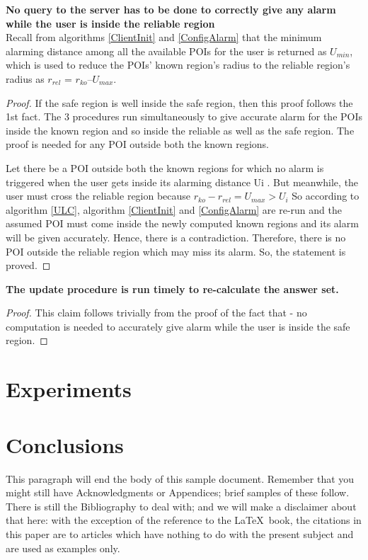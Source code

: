 \documentclass{sig-alternate}
\begin{document}
\textbf{No query to the server has to be done to correctly give any alarm while the user is inside the reliable region}\\
Recall from algorithms \ref{ClientInit} and \ref{ConfigAlarm} that the minimum alarming distance among all the available POIs for the user is returned as $U_{min}$, which is used to reduce the POIs' known region's radius to the reliable region's radius as $r_{rel}$ = $r_{ko} – U_{max}$.

\begin{proof}
If the safe region is well inside the safe region, then this proof follows the 1st fact.
The 3 procedures run simultaneously to give accurate alarm for the POIs inside the known region and so inside the reliable as well as the safe region.
The proof is needed for any POI outside both the known regions.

Let there be a POI outside both the known regions for which no alarm is triggered when the user gets inside its alarming distance Ui . 
But meanwhile, the user must cross the reliable region because $r_{ko} - r_{rel} = U_{max} > U_i$ 
So according to algorithm \ref{ULC}, algorithm \ref{ClientInit} and \ref{ConfigAlarm} are re-run and the assumed POI must come inside the newly computed known regions and its alarm will be given accurately.
Hence, there is a contradiction.
Therefore, there is no POI outside the reliable region which may miss its alarm.
So, the statement is proved.
\end{proof}

\textbf{The update procedure is run timely to re-calculate the answer set.}
\begin{proof} 
This claim follows trivially from the proof of the fact that - no computation is needed to accurately give alarm while the user is inside the safe region.
\end{proof}


\section{Experiments}

\section{Conclusions}
This paragraph will end the body of this sample document.
Remember that you might still have Acknowledgments or
Appendices; brief samples of these
follow.  There is still the Bibliography to deal with; and
we will make a disclaimer about that here: with the exception
of the reference to the \LaTeX\ book, the citations in
this paper are to articles which have nothing to
do with the present subject and are used as
examples only.
\end{document}
